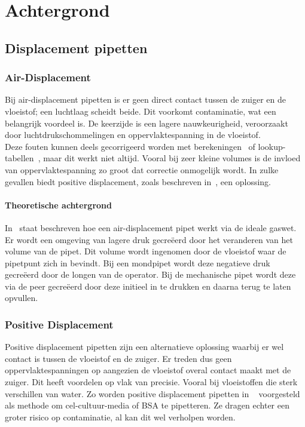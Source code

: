 \chapter{Achtergrond}


\section{Displacement pipetten}
\subsection{Air-Displacement}
Bij air-displacement pipetten is er geen direct contact tussen de zuiger en de vloeistof; een luchtlaag scheidt beide. Dit voorkomt contaminatie, wat een belangrijk voordeel is. De keerzijde is een lagere nauwkeurigheid, veroorzaakt door luchtdrukschommelingen en oppervlaktespanning in de vloeistof.
\\[12pt]Deze fouten kunnen deels gecorrigeerd worden met berekeningen\ \cite{RN15} of lookup-tabellen\ \cite{RN35}, maar dit werkt niet altijd. Vooral bij zeer kleine volumes is de invloed van oppervlaktespanning zo groot dat correctie onmogelijk wordt. In zulke gevallen biedt positive displacement, zoals beschreven in\ \cite{RN15}, een oplossing.
\subsubsection{Theoretische achtergrond}
In\ \cite{RN15} staat beschreven hoe een air-displacement pipet werkt via de ideale gaswet. Er wordt een omgeving van lagere druk gecreëerd door het veranderen van het volume van de pipet. Dit volume wordt ingenomen door de vloeistof waar de pipetpunt zich in bevindt. Bij een mondpipet wordt deze negatieve druk gecreëerd door de longen van de operator. Bij de mechanische pipet wordt deze via de peer gecreëerd door deze initieel in te drukken en daarna terug te laten opvullen.
\subsection{Positive Displacement}
Positive displacement pipetten zijn een alternatieve oplossing waarbij er wel contact is tussen de vloeistof en de zuiger. Er treden dus geen oppervlaktespanningen op aangezien de vloeistof overal contact maakt met de zuiger. Dit heeft voordelen op vlak van precisie. Vooral bij vloeistoffen die sterk verschillen van water. Zo worden positive displacement pipetten in \ \cite{RN37} voorgesteld als methode om cel-cultuur-media of BSA te pipetteren. Ze dragen echter een groter risico op contaminatie, al kan dit wel verholpen worden.

